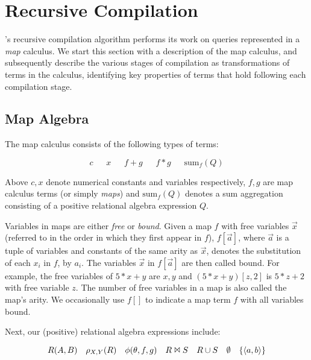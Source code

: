 \section{Recursive Compilation}
\def\dom{\mathrm{dom}}
\def\algsum{\mathrm{sum}}
\def\algif{\mathrm{if}}
\def\algthen{\mathrm{then}}
\def\algelse{\mathrm{else}}
\def\algforeach{\mathrm{foreach}}

\compiler's recursive compilation algorithm performs its work on queries
represented in a \textit{map} calculus. We start this section with a description
of the map calculus, and subsequently describe the various stages of compilation
as transformations of terms in the calculus, identifying key properties of terms
that hold following each compilation stage.

\subsection{Map Algebra}
The map calculus consists of the following types of terms:

\[
c 
\quad\;\;
x
\quad\;\;
f+g
\quad\;\;
f*g
\quad\;\;
\algsum_f(Q)
\]

Above $c,x$ denote numerical constants and variables respectively, $f,g$ are map
calculus terms (or simply \textit{maps}) and $\algsum_f(Q)$ denotes a sum
aggregation consisting of a positive relational algebra expression $Q$.

Variables in maps are either {\em free} or {\em bound}.
Given a map $f$ with free variables $\vec{x}$ (referred to in the order in which they
first appear in $f$), $f[\vec{a}]$, where $\vec{a}$ is a tuple of variables and constants
of the same arity as $\vec{x}$, denotes the substitution of each $x_i$ in $f$, by $a_i$. The
variables $\vec{x}$ in $f[\vec{a}]$ are then called bound.
For example, the free variables of $5 * x + y$ are $x,y$ and
$(5 * x + y)[z, 2]$ is $5 * z + 2$ with free variable $z$.
The number of free variables in a map is also called the map's arity.
We occasionally use $f[]$ to indicate a map term $f$ with all variables bound.

Next, our (positive) relational algebra expressions include:

\[
R(A,B)
\quad
\rho_{X,Y}(R)
\quad
\phi(\theta,f,g)
\quad
R \Join S
\quad
R \cup S
\quad
\emptyset
\quad
\{{\langle a,b\rangle}\}
\]

